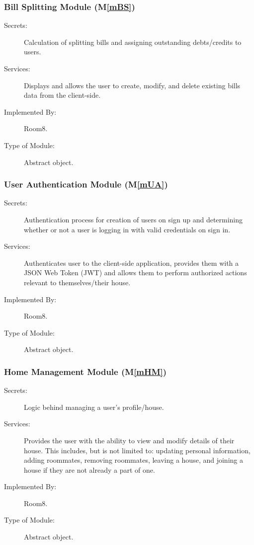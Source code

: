 \documentclass[12pt, titlepage]{article}
\newcommand{\mref}[1]{M\ref{#1}}
\begin{document}
\subsubsection{Bill Splitting Module (\mref{mBS})}
\begin{description}
\item[Secrets:] Calculation of splitting bills and assigning outstanding debts/credits to users.
\item[Services:] Displays and allows the user to create, modify, and delete existing bills data from the client-side.
\item[Implemented By:] Room8.
\item[Type of Module:] Abstract object.
\end{description}

\subsubsection{User Authentication Module (\mref{mUA})}
\begin{description}
\item[Secrets:] Authentication process for creation of users on sign up and determining whether or not a user is logging in with valid credentials on sign in.
\item[Services:] Authenticates user to the client-side application, provides them with a JSON Web Token (JWT) and allows them to perform authorized actions relevant to themselves/their house.
\item[Implemented By:] Room8.
\item[Type of Module:] Abstract object.
\end{description}

\subsubsection{Home Management Module (\mref{mHM})}
\begin{description}
\item[Secrets:] Logic behind managing a user's profile/house.
\item[Services:] Provides the user with the ability to view and modify details of their house. This includes, but is not limited to: updating personal information, adding roommates, removing roommates, leaving a house, and joining a house if they are not already a part of one. 
\item[Implemented By:] Room8.
\item[Type of Module:] Abstract object.
\end{description}
\end{document}
